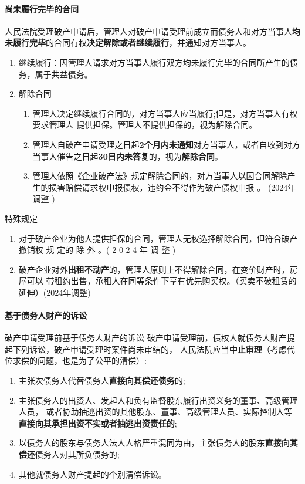 \documentclass[UTF8,12pt]{ctexart}
\numberwithin{equation}{section} %
\numberwithin{figure}{section}
\numberwithin{table}{section}
\begin{document}
	\paragraph{尚未履行完毕的合同}
	人民法院受理破产申请后，管理人对破产申请受理前成立而债务人和对方当事人\textbf{均未履行完毕}的合同有权\textbf{决定解除或者继续履行}，并通知对方当事人。
	\begin{enumerate}
		\item 继续履行：因管理人请求对方当事人履行双方均未履行完毕的合同所产生的债务，属于共益债务。 
		
		\item 解除合同
		\begin{enumerate}
			\item 管理人决定继续履行合同的，对方当事人应当履行;但是，对方当事人有权要求管理人 提供担保。管理人不提供担保的，视为解除合同。
			
			\item 管理人自破产申请受理之日起\textbf{2个月内未通知}对方当事人，或者自收到对方当事人催告之日起\textbf{30日内未答复}的，视为\textbf{解除合同}。 
			
			\item 管理人依照《企业破产法》规定解除合同的，对方当事人以因合同解除产生的损害赔偿请求权申报债权，违约金不得作为破产债权申报 。 (2024年调整 )
		\end{enumerate}
		
	\end{enumerate}
	
	特殊规定
	\begin{enumerate}
		\item 对于破产企业为他人提供担保的合同，管理人无权选择解除合同，但符合破产撤销权 规 定的 除 外 。( 2 0 2 4 年 调 整 )
		
		\item 破产企业对外\textbf{出租不动产}的，管理人原则上不得解除合同，在变价财产时，房屋可以 带租约出售，承租人在同等条件下享有优先购买权。（买卖不破租赁的延伸）(2024年调整)
	\end{enumerate}
	
	
	\paragraph{基于债务人财产的诉讼}
	破产申请受理前基于债务人财产的诉讼 破产申请受理前，债权人就债务人财产提起下列诉讼，破产申请受理时案件尚未审结的， 人民法院应当\textbf{中止审理}（考虑代位求偿的问题，也是为了公平的清偿）:
	\begin{enumerate}
		\item 主张次债务人代替债务人\textbf{直接向其偿还债务}的;
		
		\item 主张债务人的出资人、发起人和负有监督股东履行出资义务的董事、高级管理人员， 或者协助抽逃出资的其他股东、董事、高级管理人员、实际控制人等\textbf{直接向其承担出资不实或者抽逃出资责任的}; 
		
		\item 以债务人的股东与债务人法人人格严重混同为由，主张债务人的股东\textbf{直接向其偿还}债务人对其所负债务的;
		
		\item 其他就债务人财产提起的个别清偿诉讼。
	\end{enumerate}
	
\end{document}
